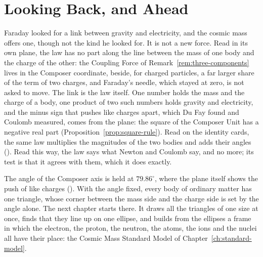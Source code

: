 \section*{Looking Back, and Ahead}\label{sec:interaction-close}

Faraday looked for a link between gravity and electricity, and the cosmic mass offers one, though not the kind he looked for. It is not a new force. Read in its own plane, the law has no part along the line between the mass of one body and the charge of the other: the Coupling Force of Remark~\ref{rem:three-components} lives in the Composer coordinate, beside, for charged particles, a far larger share of the term of two charges, and Faraday's needle, which stayed at zero, is not asked to move. The link is the law itself. One number holds the mass and the charge of a body, one product of two such numbers holds gravity and electricity, and the minus sign that pushes like charges apart, which Du Fay found and Coulomb measured, comes from the plane: the square of the Composer Unit has a negative real part (Proposition~\ref{prop:square-rule}). Read on the identity cards, the same law multiplies the magnitudes of the two bodies and adds their angles (). Read this way, the law says what Newton and Coulomb say, and no more; its test is that it agrees with them, which it does exactly.

The angle of the Composer axis is held at $79.86^\circ$, where the plane itself shows the push of like charges (). With the angle fixed, every body of ordinary matter has one triangle, whose corner between the mass side and the charge side is set by the angle alone. The next chapter starts there. It draws all the triangles of one size at once, finds that they line up on one ellipse, and builds from the ellipses a frame in which the electron, the proton, the neutron, the atoms, the ions and the nuclei all have their place: the Cosmic Mass Standard Model of Chapter~\ref{ch:standard-model}.
